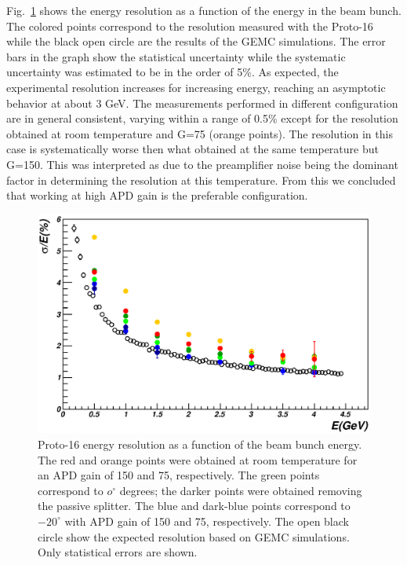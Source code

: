 Fig.~\ref{fig:btf_resolution} shows the energy resolution as a
function of the energy in the beam bunch. The colored points
correspond to the resolution measured with the Proto-16 while the
black open circle are the results of the GEMC simulations. The error
bars in the graph show the statistical uncertainty while the
systematic uncertainty was estimated to be in the order of 5\%. 
As expected, the experimental resolution increases for increasing energy,
reaching an asymptotic behavior at about 3 GeV. The measurements
performed in different configuration are in general consistent,
varying within a range of 0.5\% except for the resolution obtained at
room temperature and G=75 (orange points).
The resolution in this case is systematically worse then what obtained
at the same temperature but G=150. This was interpreted as
due to the preamplifier noise being the dominant factor in determining
the resolution at this temperature. From this we concluded that
working at high APD gain is the preferable configuration. 
\begin{figure}
\includegraphics[width=1.0\columnwidth]{./fig/btf_resolution.eps}
\caption{Proto-16 energy resolution  as a function of the beam bunch
  energy. The red and orange points were obtained at room temperature
  for an APD gain of 150 and 75, respectively. The green points
  correspond to $o^\circ$ degrees; the darker points were obtained
  removing the passive splitter. The blue and dark-blue points
  correspond to $-20^\circ$ with APD gain of 150 and 75,
  respectively. The open black circle show the expected resolution
  based on GEMC simulations. Only statistical errors are shown.}
\label{fig:btf_resolution}
\end{figure} 

